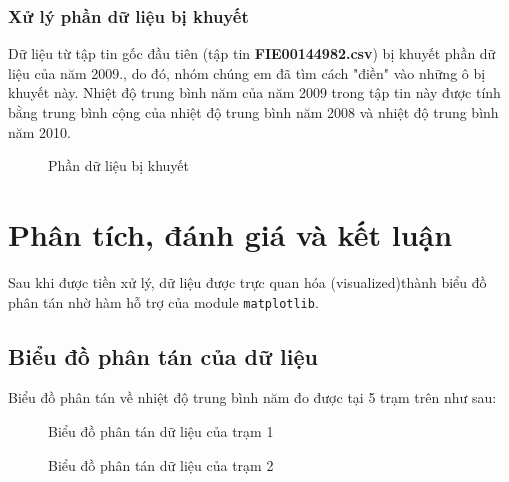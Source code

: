 \documentclass[a4paper]{article}
\begin{document}
\subsubsection{Xử lý phần dữ liệu bị khuyết}
Dữ liệu từ tập tin gốc đầu tiên (tập tin \textbf{FIE00144982.csv}) bị khuyết phần dữ liệu của năm 2009., do đó, nhóm chúng em đã tìm cách "điền" vào những ô bị khuyết này. Nhiệt độ trung bình năm của năm 2009 trong tập tin này được tính bằng trung bình cộng của nhiệt độ trung bình năm 2008 và nhiệt độ trung bình năm 2010.\\
\begin{figure}[H]
\caption{Phần dữ liệu bị khuyết}
\end{figure}

\section{Phân tích, đánh giá và kết luận}
Sau khi được tiền xử lý, dữ liệu được trực quan hóa (visualized)thành biểu đồ phân tán nhờ hàm hỗ trợ của module \lstinline{matplotlib}.

\subsection{Biểu đồ phân tán của dữ liệu}
Biểu đồ phân tán về nhiệt độ trung bình năm đo được tại 5 trạm trên như sau:
\begin{figure}[H]
\caption{Biểu đồ phân tán dữ liệu của trạm 1}
\end{figure}

\begin{figure}[H]
\caption{Biểu đồ phân tán dữ liệu của trạm 2}
\end{figure}
\end{document}
